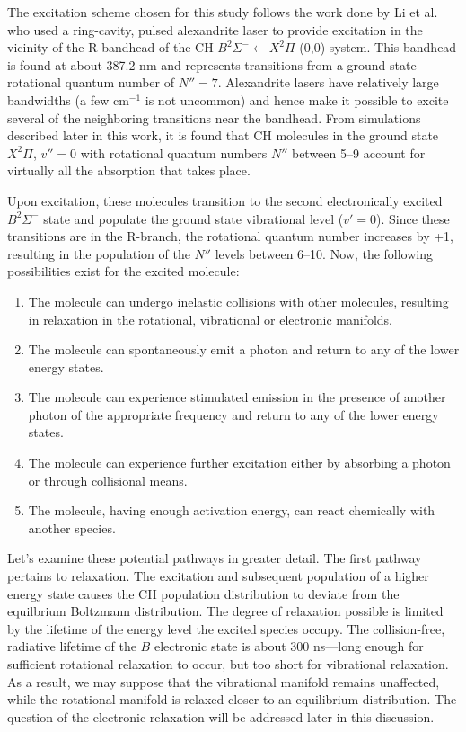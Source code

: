 The excitation scheme chosen for this study follows the work done by Li et al.\cite{2007-li-a} who used a ring-cavity, pulsed alexandrite laser to provide excitation in the vicinity of the R-bandhead of the CH \(B^2\Sigma^- \leftarrow X^2\Pi\) (0,0) system.
This bandhead is found at about 387.2 nm and represents transitions from a ground state rotational quantum number of \(N''=7\).
Alexandrite lasers have relatively large bandwidths (a few cm\(^{-1}\) is not uncommon) and hence make it possible to excite several of the neighboring transitions near the bandhead.
From simulations described later in this work, it is found that CH molecules in the ground state \(X^2\Pi\), \(v''=0\) with rotational quantum numbers \(N''\) between 5--9 account for virtually all the absorption that takes place.

Upon excitation, these molecules transition to the second electronically excited \(B^2\Sigma^-\) state and populate the ground state vibrational level (\(v'=0\)).
Since these transitions are in the R-branch, the rotational quantum number increases by +1, resulting in the population of the \(N''\) levels between 6--10.
Now, the following possibilities exist for the excited molecule:

\begin{enumerate}
\item The molecule can undergo inelastic collisions with other molecules, resulting in relaxation in the rotational, vibrational or electronic manifolds.
\item The molecule can spontaneously emit a photon and return to any of the lower energy states.
\item The molecule can experience stimulated emission in the presence of another photon of the appropriate frequency and return to any of the lower energy states.
\item The molecule can experience further excitation either by absorbing a photon or through collisional means.
\item The molecule, having enough activation energy, can react chemically with another species.
\end{enumerate}

Let's examine these potential pathways in greater detail.
The first pathway pertains to relaxation.
The excitation and subsequent population of a higher energy state causes the CH population distribution to deviate from the equilbrium Boltzmann distribution.
The degree of relaxation possible is limited by the lifetime of the energy level the excited species occupy.
The collision-free, radiative lifetime of the \(B\) electronic state is about 300 ns\cite{1996-luque-c}---long enough for sufficient rotational relaxation to occur, but too short for vibrational relaxation.
As a result, we may suppose that the vibrational manifold remains unaffected, while the rotational manifold is relaxed closer to an equilibrium distribution.
The question of the electronic relaxation will be addressed later in this discussion.

